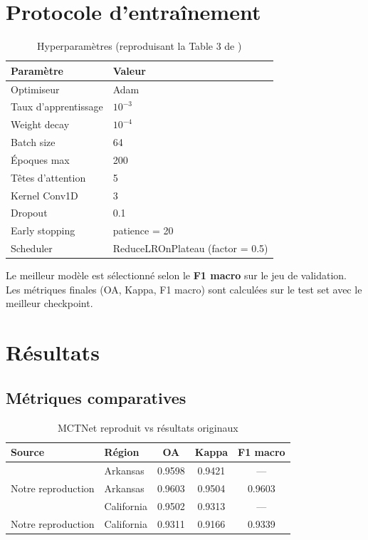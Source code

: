 \section{Protocole d'entraînement}
\label{sec:entrainement}

\begin{table}[H]
\centering
\caption{Hyperparamètres (reproduisant la Table 3 de \cite{wang2024})}
\label{tab:hyperparams}
\begin{tabular}{ll}
\toprule
\textbf{Paramètre}   & \textbf{Valeur} \\
\midrule
Optimiseur           & Adam \\
Taux d'apprentissage & $10^{-3}$ \\
Weight decay         & $10^{-4}$ \\
Batch size           & 64 \\
Époques max          & 200 \\
Têtes d'attention    & 5 \\
Kernel Conv1D        & 3 \\
Dropout              & 0.1 \\
Early stopping       & patience = 20 \\
Scheduler            & ReduceLROnPlateau (factor = 0.5) \\
\bottomrule
\end{tabular}
\end{table}

Le meilleur modèle est sélectionné selon le \textbf{F1 macro} sur le jeu de
validation. Les métriques finales (OA, Kappa, F1 macro) sont calculées sur
le test set avec le meilleur checkpoint.

\section{Résultats}
\label{sec:resultats_p1}

\subsection{Métriques comparatives}

\begin{table}[H]
\centering
\caption{MCTNet reproduit vs résultats originaux}
\label{tab:resultats_mctnet}
\begin{tabular}{llccc}
\toprule
\textbf{Source} & \textbf{Région} & \textbf{OA} & \textbf{Kappa} & \textbf{F1 macro} \\
\midrule
\cite{wang2024}    & Arkansas   & 0.9598 & 0.9421 & --- \\
Notre reproduction & Arkansas   & 0.9603 & 0.9504 & 0.9603 \\
\midrule
\cite{wang2024}    & California & 0.9502 & 0.9313 & --- \\
Notre reproduction & California & 0.9311 & 0.9166 & 0.9339 \\
\bottomrule
\end{tabular}
\end{table}

